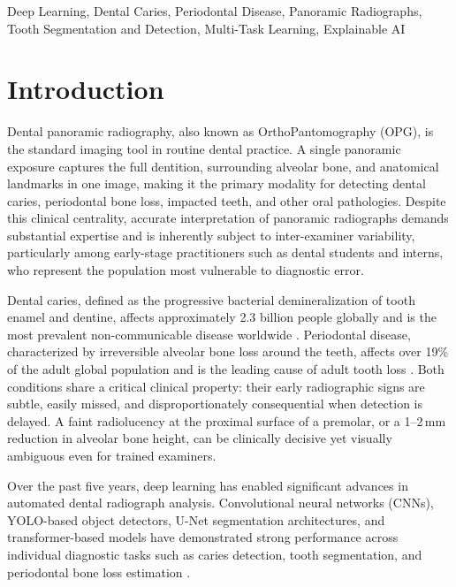 \documentclass[conference]{IEEEtran}
\begin{document}
\begin{IEEEkeywords}
Deep Learning, Dental Caries, Periodontal Disease, Panoramic
Radiographs, Tooth Segmentation and Detection, Multi-Task Learning,
Explainable AI
\end{IEEEkeywords}

\section{Introduction}
\label{sec:intro}

Dental panoramic radiography, also known as OrthoPantomography (OPG),
is the standard imaging tool in routine dental practice. A single
panoramic exposure captures the full dentition, surrounding alveolar
bone, and anatomical landmarks in one image, making it the primary
modality for detecting dental caries, periodontal bone loss, impacted
teeth, and other oral pathologies. Despite this clinical centrality,
accurate interpretation of panoramic radiographs demands substantial
expertise and is inherently subject to inter-examiner variability,
particularly among early-stage practitioners such as dental students
and interns, who represent the population most vulnerable to diagnostic
error.

Dental caries, defined as the progressive bacterial demineralization of
tooth enamel and dentine, affects approximately 2.3 billion people
globally and is the most prevalent non-communicable disease worldwide
\cite{luke2025accuracy}. Periodontal disease, characterized by
irreversible alveolar bone loss around the teeth, affects over 19\% of
the adult global population and is the leading cause of adult tooth
loss \cite{khubrani2025detection}. Both conditions share a critical
clinical property: their early radiographic signs are subtle, easily
missed, and disproportionately consequential when detection is delayed.
A faint radiolucency at the proximal surface of a premolar, or a
1--2\,mm reduction in alveolar bone height, can be clinically decisive
yet visually ambiguous even for trained examiners.

Over the past five years, deep learning has enabled significant advances
in automated dental radiograph analysis. Convolutional neural networks
(CNNs), YOLO-based object detectors, U-Net segmentation architectures,
and transformer-based models have demonstrated strong performance across
individual diagnostic tasks such as caries detection, tooth
segmentation, and periodontal bone loss estimation
\cite{nassiri2025yolo,jundaeng2025advanced,bhoopalan2026self}.
\end{document}
